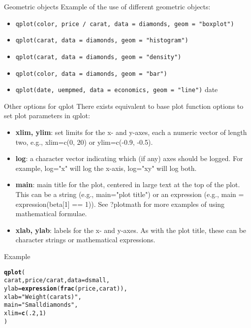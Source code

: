 \documentclass{beamer}\usepackage[]{graphicx}\usepackage[]{color}
\makeatletter
\newcommand{\hlnum}[1]{\textcolor[rgb]{0.686,0.059,0.569}{#1}}%
\newcommand{\hlstr}[1]{\textcolor[rgb]{0.192,0.494,0.8}{#1}}%
\newcommand{\hlopt}[1]{\textcolor[rgb]{0,0,0}{#1}}%
\newcommand{\hlstd}[1]{\textcolor[rgb]{0.345,0.345,0.345}{#1}}%
\newcommand{\hlkwc}[1]{\textcolor[rgb]{0.333,0.667,0.333}{#1}}%
\newcommand{\hlkwd}[1]{\textcolor[rgb]{0.737,0.353,0.396}{\textbf{#1}}}%
\newenvironment{kframe}{%
 \def\at@end@of@kframe{}%
 \ifinner\ifhmode%
  \def\at@end@of@kframe{\end{minipage}}%
  \begin{minipage}{\columnwidth}%
 \fi\fi%
 \def\FrameCommand##1{\hskip\@totalleftmargin \hskip-\fboxsep
 \colorbox{shadecolor}{##1}\hskip-\fboxsep
     \hskip-\linewidth \hskip-\@totalleftmargin \hskip\columnwidth}%
 \MakeFramed {\advance\hsize-\width
   \@totalleftmargin\z@ \linewidth\hsize
   \@setminipage}}%
 {\par\unskip\endMakeFramed%
 \at@end@of@kframe}
\newenvironment{knitrout}{}{} %
\makeatother
\begin{document}
\begin{frame}[containsverbatim]{Geometric objects}
Example of the use of different geometric objects:
\begin{itemize}
\item \texttt{qplot(color, price / carat, data = diamonds, geom = "boxplot")}
\item \texttt{qplot(carat, data = diamonds, geom = "histogram")}
\item  \texttt{qplot(carat, data = diamonds, geom = "density")}
\item \texttt{qplot(color, data = diamonds, geom = "bar")}
\item \texttt{qplot(date, uempmed, data = economics, geom = "line")}
date
\end{itemize}
\end{frame}


\begin{frame}[containsverbatim]{Other options for qplot}
There exists equivalent to base plot function options to set plot parameters in qplot:
\begin{itemize}
\item \textbf{xlim, ylim}: set limits for the x- and y-axes, each a numeric vector of length two, e.g., xlim=c(0, 20) or ylim=c(-0.9, -0.5).
\item \textbf{log}: a character vector indicating which (if any) axes should be logged. For example, log="x" will log the x-axis, log="xy" will log both.
\item  \textbf{main}: main title for the plot, centered in large text at the top of the plot. This can be a string (e.g., main="plot title") or an expression (e.g., main = expression(beta[1] == 1)). See ?plotmath for more examples of using mathematical formulae.
\item \textbf{xlab, ylab}: labels for the x- and y-axes. As with the plot title, these can be character strings or mathematical expressions.
\end{itemize}
\end{frame}

\begin{frame}[containsverbatim]{Example}
\begin{knitrout}\footnotesize
{}\color{fgcolor}\begin{kframe}
\begin{alltt}
\hlkwd{qplot}\hlstd{(}
\hlstd{carat, price}\hlopt{/}\hlstd{carat,} \hlkwc{data} \hlstd{= dsmall,}
\hlkwc{ylab} \hlstd{=} \hlkwd{expression}\hlstd{(}\hlkwd{frac}\hlstd{(price,carat)),}
\hlkwc{xlab} \hlstd{=} \hlstr{"Weight (carats)"}\hlstd{,}
\hlkwc{main}\hlstd{=}\hlstr{"Small diamonds"}\hlstd{,}
\hlkwc{xlim} \hlstd{=} \hlkwd{c}\hlstd{(}\hlnum{.2}\hlstd{,}\hlnum{1}\hlstd{)}
\hlstd{)}
\end{alltt}
\end{kframe}
\end{knitrout}
\end{frame}
\end{document}
